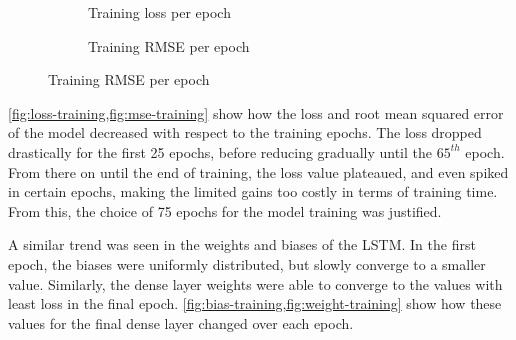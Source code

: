 \begin{figure}[h]
    \centering
    \caption{Analysis of loss and RMSE in training}
    \label{fig:loss-mse-training}
    \begin{subfigure}[b]{0.45\linewidth}
        \caption{Training loss per epoch}
        \label{fig:loss-training}
    \end{subfigure}
    \begin{subfigure}[b]{0.45\linewidth}
        \caption{Training RMSE per epoch}
        \label{fig:mse-training}
    \end{subfigure}
\end{figure}

\cref{fig:loss-training,fig:mse-training} show how the loss and root mean squared error of the model decreased with respect to the training epochs. The loss dropped drastically for the first 25 epochs, before reducing gradually until the $65^{th}$ epoch. From there on until the end of training, the loss value plateaued, and even spiked in certain epochs, making the limited gains too costly in terms of training time. From this, the choice of 75 epochs for the model training was justified.\par

A similar trend was seen in the weights and biases of the LSTM. In the first epoch, the biases were uniformly distributed, but slowly converge to a smaller value. Similarly, the dense layer weights were able to converge to the values with least loss in the final epoch. \cref{fig:bias-training,fig:weight-training} show how these values for the final dense layer changed over each epoch.\par

